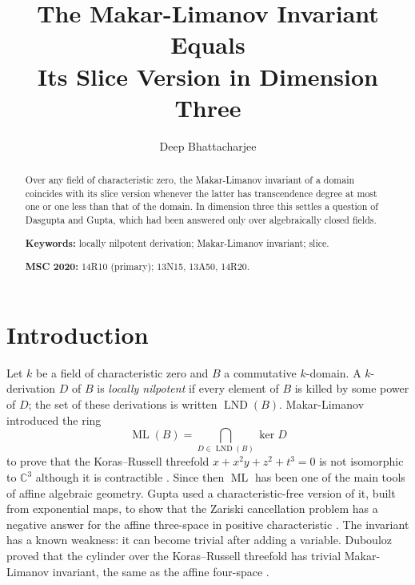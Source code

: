\documentclass[11pt]{amsart}
\theoremstyle{definition}
\newcommand{\CC}{\mathbb{C}}
\DeclareMathOperator{\ML}{ML}
\DeclareMathOperator{\LND}{LND}
\begin{document}
\title[The Makar-Limanov invariant equals its slice version]{The Makar-Limanov Invariant Equals\\ Its Slice Version in Dimension Three}

\author{Deep Bhattacharjee}
\address{Formerly, Electro-Gravitational Space Propulsion Laboratory (EGSPL), Bhubaneswar, Odisha 751030, India}
\address{Formerly, University of Calcutta (Heramba Chandra College), 23/49 Gariahat Road, Golpark, Kolkata 700029, West Bengal, India}

\begin{abstract}
Over any field of characteristic zero, the Makar-Limanov invariant of a domain coincides with its slice version whenever the latter has transcendence degree at most one or one less than that of the domain. In dimension three this settles a question of Dasgupta and Gupta, which had been answered only over algebraically closed fields.

\medskip\noindent\textbf{Keywords:} locally nilpotent derivation; Makar-Limanov invariant; slice.

\smallskip\noindent\textbf{MSC 2020:} 14R10 (primary); 13N15, 13A50, 14R20.
\end{abstract}

\maketitle

\section{Introduction}\label{sec:intro}

Let $k$ be a field of characteristic zero and $B$ a commutative $k$-domain. A $k$-derivation $D$ of $B$ is \emph{locally nilpotent} if every element of $B$ is killed by some power of $D$; the set of these derivations is written $\LND(B)$. Makar-Limanov introduced the ring
\[
\ML(B)=\bigcap_{D\in\LND(B)}\ker D
\]
to prove that the Koras--Russell threefold $x+x^2y+z^2+t^3=0$ is not isomorphic to $\CC^3$ although it is contractible \cite{ML96}. Since then $\ML$ has been one of the main tools of affine algebraic geometry. Gupta used a characteristic-free version of it, built from exponential maps, to show that the Zariski cancellation problem has a negative answer for the affine three-space in positive characteristic \cite{Gup14a,Gup14b}. The invariant has a known weakness: it can become trivial after adding a variable. Dubouloz proved that the cylinder over the Koras--Russell threefold has trivial Makar-Limanov invariant, the same as the affine four-space \cite{Dub09}.
\end{document}
